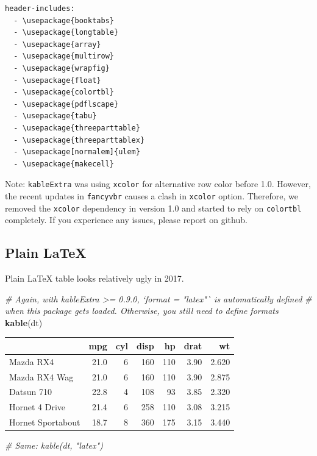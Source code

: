 \documentclass[table]{article}
\newenvironment{Shaded}{\begin{snugshade}}{\end{snugshade}}
\newcommand{\CommentTok}[1]{\textcolor[rgb]{0.56,0.35,0.01}{\textit{#1}}}
\newcommand{\KeywordTok}[1]{\textcolor[rgb]{0.13,0.29,0.53}{\textbf{#1}}}
\newcommand{\NormalTok}[1]{#1}
\begin{document}
\begin{verbatim}
header-includes:
  - \usepackage{booktabs}
  - \usepackage{longtable}
  - \usepackage{array}
  - \usepackage{multirow}
  - \usepackage{wrapfig}
  - \usepackage{float}
  - \usepackage{colortbl}
  - \usepackage{pdflscape}
  - \usepackage{tabu}
  - \usepackage{threeparttable}
  - \usepackage{threeparttablex}
  - \usepackage[normalem]{ulem}
  - \usepackage{makecell}
\end{verbatim}

Note: \texttt{kableExtra} was using \texttt{xcolor} for alternative row
color before 1.0. However, the recent updates in \texttt{fancyvbr}
causes a clash in \texttt{xcolor} option. Therefore, we removed the
\texttt{xcolor} dependency in version 1.0 and started to rely on
\texttt{colortbl} completely. If you experience any issues, please
report on github.

\hypertarget{plain-latex}{%
\subsection{Plain LaTeX}\label{plain-latex}}

Plain LaTeX table looks relatively ugly in 2017.

\begin{Shaded}
\begin{Highlighting}[]
\CommentTok{# Again, with kableExtra >= 0.9.0, `format = "latex"` is automatically defined}
\CommentTok{# when this package gets loaded. Otherwise, you still need to define formats}
\KeywordTok{kable}\NormalTok{(dt)}
\end{Highlighting}
\end{Shaded}

\begin{tabular}{l|r|r|r|r|r|r}
\hline
  & mpg & cyl & disp & hp & drat & wt\\
\hline
Mazda RX4 & 21.0 & 6 & 160 & 110 & 3.90 & 2.620\\
\hline
Mazda RX4 Wag & 21.0 & 6 & 160 & 110 & 3.90 & 2.875\\
\hline
Datsun 710 & 22.8 & 4 & 108 & 93 & 3.85 & 2.320\\
\hline
Hornet 4 Drive & 21.4 & 6 & 258 & 110 & 3.08 & 3.215\\
\hline
Hornet Sportabout & 18.7 & 8 & 360 & 175 & 3.15 & 3.440\\
\hline
\end{tabular}

\begin{Shaded}
\begin{Highlighting}[]
\CommentTok{# Same: kable(dt, "latex")}
\end{Highlighting}
\end{Shaded}
\end{document}
